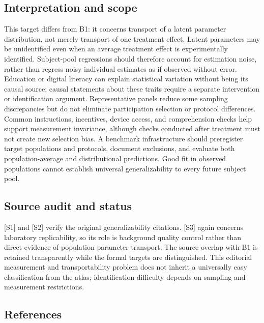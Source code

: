\documentclass[11pt,a4paper]{article}
\begin{document}
\subsection*{Interpretation and scope}

This target differs from B1: it concerns transport of a latent parameter distribution, not merely transport of one treatment effect. Latent parameters may be unidentified even when an average treatment effect is experimentally identified. Subject-pool regressions should therefore account for estimation noise, rather than regress noisy individual estimates as if observed without error. Education or digital literacy can explain statistical variation without being its causal source; causal statements about these traits require a separate intervention or identification argument. Representative panels reduce some sampling discrepancies but do not eliminate participation selection or protocol differences. Common instructions, incentives, device access, and comprehension checks help support measurement invariance, although checks conducted after treatment must not create new selection bias. A benchmark infrastructure should preregister target populations and protocols, document exclusions, and evaluate both population-average and distributional predictions. Good fit in observed populations cannot establish universal generalizability to every future subject pool.

\subsection*{Source audit and status}

[S1] and [S2] verify the original generalizability citations. [S3] again concerns laboratory replicability, so its role is background quality control rather than direct evidence of population parameter transport. The source overlap with B1 is retained transparently while the formal targets are distinguished. This editorial measurement and transportability problem does not inherit a universally easy classification from the atlas; identification difficulty depends on sampling and measurement restrictions.

\subsection*{References}
\end{document}
